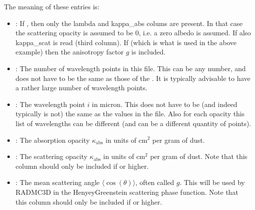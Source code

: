 \documentclass[letterpaper,10pt,english]{sphinxmanual}
\begin{document}
The meaning of these entries is:
\begin{itemize}
\item {} 
: If , then only the lambda and
kappa\_abs colums are present. In that case the scattering opacity is
assumed to be 0, i.e. a zero albedo is assumed. If  also
kappa\_scat is read (third column). If  (which is what is used in
the above example) then  the anisotropy factor \(g\) is included.

\item {} 
: The number of wavelength points in this file. This
can be any number, and does not have to be the same as those of the
. It is typically advisable to have a rather
large number of wavelength points.

\item {} 
: The wavelength point \(i\) in micron. This does
not have to be (and indeed typically is not) the same as the values in the
 file. Also for each opacity this list of
wavelengths can be different (and can be a different quantity of points).

\item {} 
: The absorption opacity \(\kappa_{\mathrm{abs}}\) in units of \(\mathrm{cm}^2\) per gram of dust.

\item {} 
: The scattering opacity \(\kappa_{\mathrm{abs}}\) in units of \(\mathrm{cm}^2\)
per gram of dust. Note that this column should only be included if
 or higher.

\item {} 
: The mean scattering angle
\(\langle\cos(\theta)\rangle\), often called \(g\). This will be used by
RADMC\sphinxhyphen{}3D in the Henyey\sphinxhyphen{}Greenstein scattering phase function. Note that
this column should only be included if  or higher.

\end{itemize}
\end{document}
